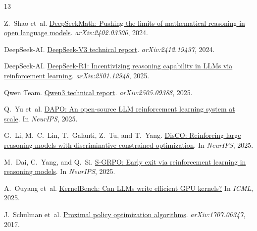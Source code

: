 \documentclass{article}
\begin{document}

\setlength{\bibsep}{0pt}
\begin{thebibliography}{13}
\small

Z.~Shao et~al.
\newblock \href{https://arxiv.org/abs/2402.03300}{DeepSeekMath: Pushing the limits of mathematical reasoning in open language models}.
\newblock \emph{arXiv:2402.03300}, 2024.

DeepSeek-AI.
\newblock \href{https://arxiv.org/abs/2412.19437}{DeepSeek-V3 technical report}.
\newblock \emph{arXiv:2412.19437}, 2024.

DeepSeek-AI.
\newblock \href{https://arxiv.org/abs/2501.12948}{DeepSeek-R1: Incentivizing reasoning capability in LLMs via reinforcement learning}.
\newblock \emph{arXiv:2501.12948}, 2025.

Qwen Team.
\newblock \href{https://arxiv.org/abs/2505.09388}{Qwen3 technical report}.
\newblock \emph{arXiv:2505.09388}, 2025.

Q.~Yu et~al.
\newblock \href{https://proceedings.neurips.cc/paper_files/paper/2025/hash/a4277440d50f1f15d2cb4c14f7e0c0d2-Abstract-Conference.html}{DAPO: An open-source LLM reinforcement learning system at scale}.
\newblock In \emph{NeurIPS}, 2025.

G.~Li, M.~C.~Lin, T.~Galanti, Z.~Tu, and T.~Yang.
\newblock \href{https://proceedings.neurips.cc/paper_files/paper/2025/hash/52d6c85793b3dd47636eb430710da915-Abstract-Conference.html}{DisCO: Reinforcing large reasoning models with discriminative constrained optimization}.
\newblock In \emph{NeurIPS}, 2025.

M.~Dai, C.~Yang, and Q.~Si.
\newblock \href{https://proceedings.neurips.cc/paper_files/paper/2025/hash/44f09d1973a88529b40029e6c3693ded-Abstract-Conference.html}{S-GRPO: Early exit via reinforcement learning in reasoning models}.
\newblock In \emph{NeurIPS}, 2025.

A.~Ouyang et~al.
\newblock \href{https://proceedings.mlr.press/v267/ouyang25a.html}{KernelBench: Can LLMs write efficient GPU kernels?}
\newblock In \emph{ICML}, 2025.

J.~Schulman et~al.
\newblock \href{https://arxiv.org/abs/1707.06347}{Proximal policy optimization algorithms}.
\newblock \emph{arXiv:1707.06347}, 2017.


\end{thebibliography}
\end{document}
